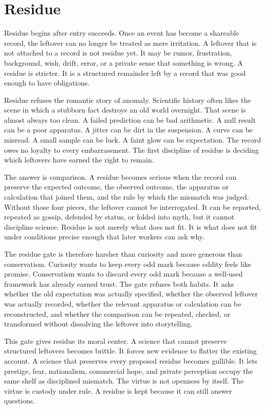 \chapter{Residue}
\label{chap:residue}

\begin{chapteressay}
Residue begins after entry succeeds. Once an event has become a shareable
record, the leftover can no longer be treated as mere irritation. A leftover
that is not attached to a record is not residue yet. It may be rumor,
frustration, background, wish, drift, error, or a private sense that something
is wrong. A residue is stricter. It is a structured remainder left by a record
that was good enough to have obligations.

Residue refuses the romantic story of anomaly. Scientific history often likes
the scene in which a stubborn fact destroys an old world overnight. That scene
is almost always too clean. A failed prediction can be bad arithmetic. A null
result can be a poor apparatus. A jitter can be dirt in the suspension. A curve
can be misread. A small sample can be luck. A faint glow can be expectation.
The record owes no loyalty to every embarrassment. The first discipline of
residue is deciding which leftovers have earned the right to remain.

The answer is comparison. A residue becomes serious when the record can
preserve the expected outcome, the observed outcome, the apparatus or
calculation that joined them, and the rule by which the mismatch was judged.
Without those four pieces, the leftover cannot be interrogated. It can be
reported, repeated as gossip, defended by status, or folded into myth, but it
cannot discipline science. Residue is not merely what does not fit. It is what
does not fit under conditions precise enough that later workers can ask why.

The residue gate is therefore harsher than curiosity and more generous than
conservatism. Curiosity wants to keep every odd mark because oddity feels like
promise. Conservatism wants to discard every odd mark because a well-used
framework has already earned trust. The gate refuses both habits. It asks
whether the old expectation was actually specified, whether the observed
leftover was actually recorded, whether the relevant apparatus or calculation
can be reconstructed, and whether the comparison can be repeated, checked, or
transformed without dissolving the leftover into storytelling.

This gate gives residue its moral center. A science that cannot preserve
structured leftovers becomes brittle. It forces new evidence to flatter the
existing account. A science that preserves every proposed residue becomes
gullible. It lets prestige, fear, nationalism, commercial hope, and private
perception occupy the same shelf as disciplined mismatch. The virtue is not
openness by itself. The virtue is custody under rule. A residue is kept because
it can still answer questions.


\end{chapteressay}
